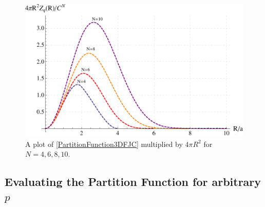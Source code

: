 \begin{figure}[htp]
\centering \includegraphics[scale=0.6]{Graphics/PartitionFunction3Dn.pdf} 
\caption{A plot of \eqref{PartitionFunction3DFJC} multiplied by $4\pi R^{2}$
for $N=4,6,8,10$.}
\label{fig:PF3Dn} 
\end{figure}

\subsection{Evaluating the Partition Function for arbitrary $p$}

